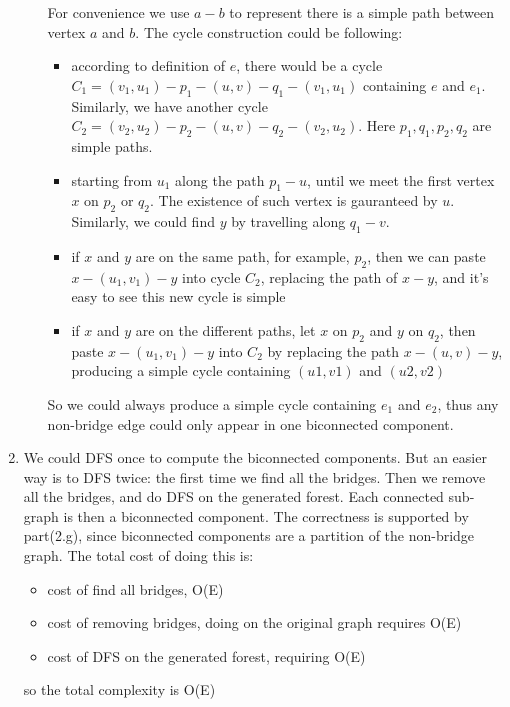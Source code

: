 \documentclass[paper=a4, fontsize=11pt]{scrartcl} %
\numberwithin{equation}{section} %
\numberwithin{figure}{section} %
\numberwithin{table}{section} %
\begin{document}
\begin{enumerate}[label={2.(\alph*)}]
\begin{enumerate}
      For convenience we use $a-b$ to represent there is a simple path between vertex $a$ and $b$. The cycle construction could be following:
      \begin{itemize}
	\item according to definition of $e$, there would be a cycle $C_1=(v_1,u_1)-p_1-(u,v)-q_1-(v_1,u_1)$ containing $e$ and $e_1$. Similarly,
	  we have another cycle $C_2=(v_2,u_2)-p_2-(u,v)-q_2-(v_2,u_2)$. Here $p_1,q_1,p_2,q_2$ are simple paths.
	\item starting from $u_1$ along the path $p_1-u$, until we meet the first vertex $x$ on $p_2$ or $q_2$. The existence of such vertex is
	  gauranteed by $u$. Similarly, we could find $y$ by travelling along $q_1-v$. 
	\item if $x$ and $y$ are on the same path, for example, $p_2$, then we can paste $x-(u_1,v_1)-y$ into cycle $C_2$, replacing
	  the path of $x-y$, and it's easy to see this new cycle is simple
	\item if $x$ and $y$ are on the different paths, let $x$ on $p_2$ and $y$ on $q_2$, then paste $x-(u_1,v_1)-y$ into $C_2$ by
	  replacing the path $x-(u,v)-y$, producing a simple cycle containing $(u1,v1)$ and $(u2,v2)$
      \end{itemize}
      So we could always produce a simple cycle containing $e_1$ and $e_2$, thus any non-bridge edge could only appear in one
      biconnected component.

  \end{enumerate}


  \item 
    We could DFS once to compute the biconnected components. But an easier way is to DFS twice: the first time we find all the bridges. Then
    we remove all the bridges, and do DFS on the generated forest. Each connected sub-graph is then a biconnected component. The correctness
    is supported by part(2.g), since biconnected components are a partition of the non-bridge graph. The total cost of doing this is:
    \begin{itemize}
      \item cost of find all bridges, O(E)
      \item cost of removing bridges, doing on the original graph requires O(E)
      \item cost of DFS on the generated forest, requiring O(E)
    \end{itemize}
    so the total complexity is O(E)


\end{enumerate}
\end{document}
